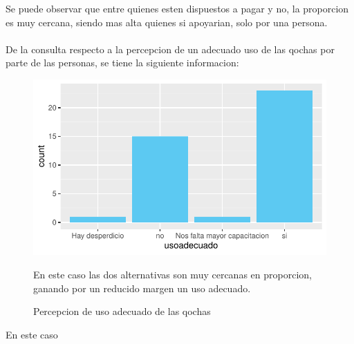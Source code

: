\documentclass[12pt]{article}\usepackage[]{graphicx}\usepackage[]{xcolor}
\makeatletter
\def\maxwidth{ %
  \ifdim\Gin@nat@width>\linewidth
    \linewidth
  \else
    \Gin@nat@width
  \fi
}
\newenvironment{knitrout}{}{} %
\makeatother
\begin{document}
	Se puede observar que entre quienes esten dispuestos a pagar y no, la proporcion es muy cercana, siendo mas alta quienes si apoyarian, solo por una persona.\\
	\\
	De la consulta respecto a la percepcion de un adecuado uso de las qochas por parte de las personas, se tiene la siguiente informacion:
	\begin{figure}[H]
	\centering
\begin{knitrout}
\color{fgcolor}
\includegraphics[width=\maxwidth]{figure/veintinueve-1} 
\end{knitrout}
	\caption{Percepcion de uso adecuado de las qochas}
	En este caso las dos alternativas son muy cercanas en proporcion, ganando por un reducido margen un uso adecuado.
	\end{figure}
	En este caso 
\end{document}
